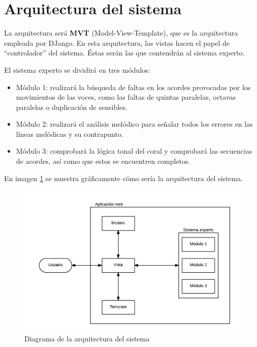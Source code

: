 \section{Arquitectura del sistema}

La arquitectura será \textbf{MVT} (Model-View-Template), que es la arquitectura empleada por DJango. En esta arquitectura, las vistas hacen el papel de ``controlador'' del sistema. Éstas serán las que contendrán al sistema experto.  

El sistema experto se dividirá en tres módulos:

\begin{itemize}

	\item Módulo 1: realizará la búsqueda de faltas en los acordes provocadas por los movimientos de las voces, como las faltas de quintas paralelas, octavas paralelas o duplicación de sensibles.

	\item Módulo 2: realizará el análisis melódico para señalar todos los errores en las líneas melódicas y su contrapunto.

	\item Módulo 3: comprobará la lógica tonal del coral y comprobará las secuencias de acordes, así como que estos se encuentren completos. 

\end{itemize}

En imagen \ref{fig4.2.1} se muestra gráficamente cómo sería la arquitectura del sistema.

\begin{figure}[H]
	\centering
	\includegraphics[scale=0.8]{imagenes/arquitectura.png}
	\caption{Diagrama de la arquitectura del sistema}
	\label{fig4.2.1}
\end{figure}